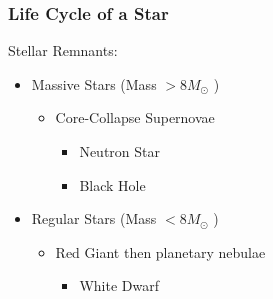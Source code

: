 \documentclass{beamer}
\begin{document}
\begin{frame}
\frametitle{Life Cycle of a Star}
Stellar Remnants:
\begin{itemize}
    \item Massive Stars (Mass $> 8 M_{\odot}$ )
        \pause
        \begin{itemize}
            \item Core-Collapse Supernovae 
            \begin{itemize}
                \pause
                \item Neutron Star
                \pause
                \item Black Hole
            \end{itemize}
        \end{itemize}
    \item Regular Stars (Mass $< 8 M_{\odot}$ )
        \pause
        \begin{itemize}
            \item Red Giant then planetary nebulae
            \begin{itemize}
                \pause
                \item White Dwarf
            \end{itemize}
        \end{itemize}
\end{itemize}
\end{frame}




\begin{frame}
\printbibliography
\end{frame}




\end{document}
